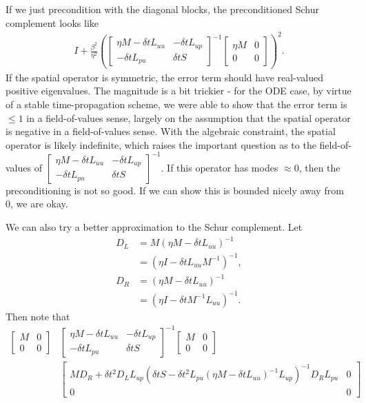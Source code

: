 \documentclass[a4paper,10pt]{article}
\begin{document}
%
If we just precondition with the diagonal blocks, the preconditioned 
Schur complement looks like
%
\begin{align*}
I + \frac{\beta^2}{\eta^2} \left(\begin{bmatrix} \eta M - \delta tL_{uu} & -\delta tL_{up} \\
		-\delta tL_{pu} & \delta tS \end{bmatrix}^{-1}
	\begin{bmatrix} \eta M & 0 \\ 0 & 0 \end{bmatrix} \right)^2.
\end{align*}
%
If the spatial operator is symmetric, the error term should have real-valued
positive eigenvalues. The magnitude is a bit trickier - for the ODE case,
by virtue of a stable time-propagation scheme, we were able to show that
the error term is $\leq 1$ in a field-of-values sense, largely on the
assumption that the spatial operator is negative in a field-of-values
sense. With the algebraic constraint, the spatial operator is likely
indefinite, which raises the important question as to the field-of-values
of $\begin{bmatrix} \eta M - \delta tL_{uu} & -\delta tL_{up} \\
-\delta tL_{pu} & \delta tS \end{bmatrix}^{-1}$. If this operator
has modes $\approx 0$, then the preconditioning is not so good. If we
can show this is bounded nicely away from 0, we are okay.

We can also try a better approximation to the Schur complement. Let
%
\begin{align*}
D_L & = M(\eta M - \delta tL_{uu})^{-1} \\
& = (\eta I - \delta tL_{uu}M^{-1})^{-1}, \\
D_R & = (\eta M - \delta tL_{uu})^{-1} \\
& = (\eta I - \delta tM^{-1}L_{uu})^{-1}.
\end{align*}
%
Then note that
%
\begin{align*}
\begin{bmatrix} M & 0 \\ 0 & 0 \end{bmatrix}& 
	\begin{bmatrix} \eta M - \delta tL_{uu} & -\delta tL_{up} \\ -\delta tL_{pu} & \delta tS
	\end{bmatrix}^{-1}
	\begin{bmatrix} M & 0 \\ 0 & 0 \end{bmatrix} \\
& \begin{bmatrix} MD_R + \delta t^2D_LL_{up}
	(\delta tS - \delta t^2L_{pu}(\eta M - \delta tL_{uu})^{-1}L_{up})^{-1}
		D_RL_{pu} & 0 \\ 0 & 0 \end{bmatrix}
\end{align*}
% 
\end{document}
